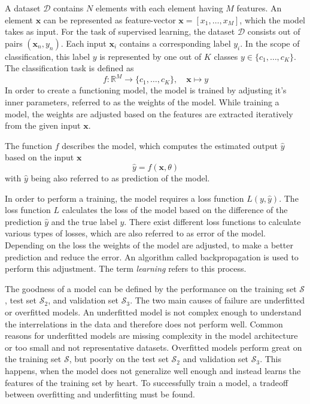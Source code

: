 A dataset $\mathcal{D}$ contains $N$ elements with each element having $M$ features.
An element $\textbf{x}$ can be represented as feature-vector $\textbf{x} = [x_1, \dots ,x_M]$, which the model takes as input.
For the task of supervised learning, the dataset $\mathcal{D}$ consists out of pairs $(\textbf{x}_n, y_n)$. Each input $\textbf{x}_i$ contains a corresponding label $y_i$.
In the scope of classification, this label $y$ is represented by one out of $K$ classes $y \in \lbrace c_1, \dots, c_K \rbrace$.
The classification task is defined as  
\begin{equation}
	f: \mathbb{R}^M \rightarrow \lbrace c_1,\ldots,c_K \rbrace, \quad \textbf{x} \mapsto y
\end{equation}
In order to create a functioning model, the model is trained by adjusting it's inner parameters, referred to as the weights of the model.
While training a model, the weights are adjusted based on the features are extracted iteratively from the given input $\textbf{x}$.

The function $f$ describes the model, which computes the estimated output $\hat{y}$ based on the input $\textbf{x}$
\begin{equation}
	\hat y = f(\textbf{x}, \theta)
\end{equation}
with $\hat{y}$ being also referred to as prediction of the model.

In order to perform a training, the model requires a loss function $L(y,\hat{y})$.
The loss function $L$ calculates the loss of the model based on the difference of the prediction $\hat{y}$ and the true label $y$.
There exist different loss functions to calculate various types of losses, which are also referred to as error of the model.
Depending on the loss the weights of the model are adjusted, to make a better prediction and reduce the error.
An algorithm called backpropagation is used to perform this adjustment.
The term \textit{learning} refers to this process.

The goodness of a model can be defined by the performance on the training set $\mathcal{S}$, test set $\mathcal{S}_2$, and validation set $\mathcal{S}_3$.
The two main causes of failure are underfitted or overfitted models.
An underfitted model is not complex enough to understand the interrelations in the data and therefore does not perform well.
Common reasons for underfitted models are missing complexity in the model architecture or too small and not representative datasets.
Overfitted models perform great on the training set $\mathcal{S}$, but poorly on the test set $\mathcal{S}_2$ and validation set $\mathcal{S}_3$.
This happens, when the model does not generalize well enough and instead learns the features of the training set by heart.
To successfully train a model, a tradeoff between overfitting and underfitting must be found.

